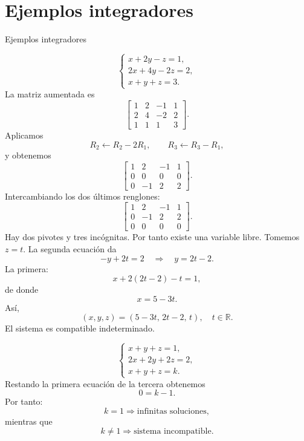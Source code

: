 \documentclass[aspectratio=169,9pt]{beamer}
\theoremstyle{remark}
\newcommand{\R}{\mathbb{R}}
\begin{document}
\section{Ejemplos integradores}
\begin{frame}[allowframebreaks,t]{Ejemplos integradores}
\par{}\par\smallskip

\[
\begin{cases}
x+2y-z=1,\\
2x+4y-2z=2,\\
x+y+z=3.
\end{cases}
\]
La matriz aumentada es
\[
\left[
\begin{array}{ccc|c}
1&2&-1&1\\
2&4&-2&2\\
1&1&1&3
\end{array}
\right].
\]
Aplicamos
\[
R_2\leftarrow R_2-2R_1,\qquad
R_3\leftarrow R_3-R_1,
\]
y obtenemos
\[
\left[
\begin{array}{ccc|c}
1&2&-1&1\\
0&0&0&0\\
0&-1&2&2
\end{array}
\right].
\]
Intercambiando los dos últimos renglones:
\[
\left[
\begin{array}{ccc|c}
1&2&-1&1\\
0&-1&2&2\\
0&0&0&0
\end{array}
\right].
\]
Hay dos pivotes y tres incógnitas. Por tanto existe una variable libre. Tomemos $z=t$. La segunda
ecuación da
\[
-y+2t=2\quad\Longrightarrow\quad y=2t-2.
\]
La primera:
\[
x+2(2t-2)-t=1,
\]
de donde
\[
x=5-3t.
\]
Así,
\[
\boxed{(x,y,z)=(5-3t,\,2t-2,\,t),\quad t\in\R.}
\]
El sistema es compatible indeterminado.

\par{}\par\smallskip

\[
\begin{cases}
x+y+z=1,\\
2x+2y+2z=2,\\
x+y+z=k.
\end{cases}
\]
Restando la primera ecuación de la tercera obtenemos
\[
0=k-1.
\]
Por tanto:
\[
k=1\Longrightarrow\text{infinitas soluciones},
\]
mientras que
\[
k\neq1\Longrightarrow\text{sistema incompatible}.
\]
\end{frame}
\end{document}
